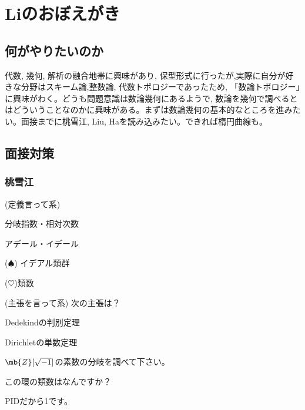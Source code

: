 \clearpage
\section{Liのおぼえがき}


\subsection{何がやりたいのか}
代数, 幾何, 解析の融合地帯に興味があり, 保型形式に行ったが,実際に自分が好きな分野はスキーム論,整数論, 代数トポロジーであったため, 「数論トポロジー」に興味がわく。どうも問題意識は数論幾何にあるようで, 数論を幾何で調べるとはどういうことなのかに興味がある。まずは数論幾何の基本的なところを進みたい。面接までに桃雪江, Liu, Haを読み込みたい。できれば楕円曲線も。\par

\subsection{面接対策}
\subsubsection{桃雪江}
\begin{egprob} (定義言って系)
\ben
\item 分岐指数・相対次数
\item アデール・イデール
\item ($\spadesuit$) イデアル類群
\item ($\heartsuit$)類数
\een
\end{egprob}

\begin{egprob} (主張を言って系)
次の主張は？
\ben
\item Dedekindの判別定理
\item Dirichletの単数定理
\een
\end{egprob}
\begin{egans}

\end{egans}

\begin{egprob}
\ben 
\item $\mb{Z}[\sqrt{-1}]$の素数の分岐を調べて下さい。
\item この環の類数はなんですか？
\een
\end{egprob}
\begin{egans}
\ben
\item
\item PIDだから1です。
\een
\end{egans}

